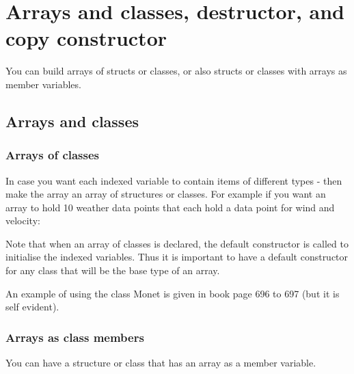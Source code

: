 \section{Arrays and classes, destructor, and copy constructor}

You can build arrays of structs or classes, or also structs or classes with arrays as member variables.

\subsection{Arrays and classes}

\subsubsection{Arrays of classes}
In case you want each indexed variable to contain items of different types - then make the
array an array of structures or classes. For example if you want an array to hold 10 weather
data points that each hold a data point for wind and velocity:

Note that when an array of classes is declared, the default constructor is called to initialise
the indexed variables. Thus it is important to have a default constructor for any class that
will be the base type of an array.


An example of using the class Monet is given in book page 696 to 697 (but it is self evident).


\subsubsection{Arrays as class members}
You can have a structure or class that has an array as a member variable.


